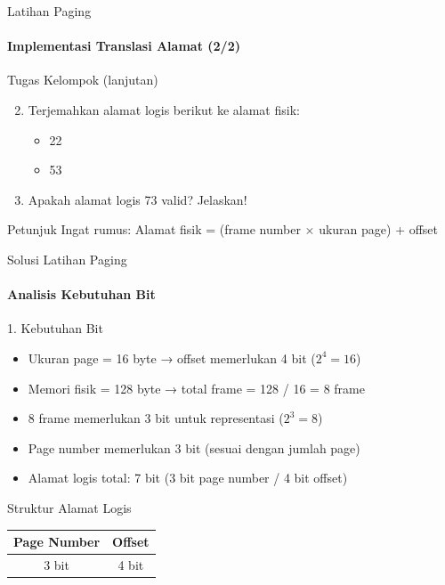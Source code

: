 \documentclass[10pt,aspectratio=169]{beamer}
\begin{document}
\begin{frame}{Latihan Paging}
    \framesubtitle{Implementasi Translasi Alamat (2/2)}
    
    \begin{alertblock}{Tugas Kelompok (lanjutan)}
        \begin{enumerate}\setcounter{enumi}{1}
            \item Terjemahkan alamat logis berikut ke alamat fisik:
            \begin{itemize}
                \item 22
                \item 53
            \end{itemize}
            \item Apakah alamat logis 73 valid? Jelaskan!
        \end{enumerate}
    \end{alertblock}
    
    \begin{block}{Petunjuk}
        Ingat rumus: Alamat fisik = (frame number $\times$ ukuran page) + offset
    \end{block}
\end{frame}

\begin{frame}{Solusi Latihan Paging}
    \framesubtitle{Analisis Kebutuhan Bit}
    
    \begin{block}{1. Kebutuhan Bit}
        \begin{itemize}
            \item Ukuran page = 16 byte → offset memerlukan 4 bit ($2^4 = 16$)
            \item Memori fisik = 128 byte → total frame = 128 / 16 = 8 frame
            \item 8 frame memerlukan 3 bit untuk representasi ($2^3 = 8$)
            \item Page number memerlukan 3 bit (sesuai dengan jumlah page)
            \item Alamat logis total: 7 bit (3 bit page number / 4 bit offset)      \end{itemize}
    \end{block}
    
    \begin{alertblock}{Struktur Alamat Logis}
        \begin{center}
            \begin{tabular}{|c|c|}
                \hline
                \textbf{Page Number} & \textbf{Offset} \\
                \hline
                3 bit & 4 bit \\
                \hline
            \end{tabular}
        \end{center}
    \end{alertblock}
\end{frame}
\end{document}
